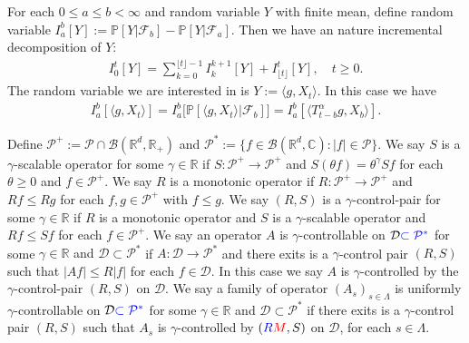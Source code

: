 \documentclass[12pt,oneside,english]{amsart}
\theoremstyle{plain}
\theoremstyle{definition}
\numberwithin{equation}{section}
\newcommand{\added}[1]{{\color{blue}#1}}\newcommand{\deleted}[1]{{\color{red}#1}}
\begin{document}
\added{
	For each $0 \leq a \leq b <\infty$ and  random variable $Y$ with finite mean, define random variable
$
   	I_a^b[Y]
    := \mathbb P[Y|\mathscr F_b] - \mathbb P[Y|\mathscr F_a].
$
	Then we have an nature incremental decomposition of $Y$:
\begin{align}
    I_0^t[Y]
    = \sum_{k = 0}^{\lfloor t \rfloor - 1} I_k^{k+1}[Y] + I_{\lfloor t \rfloor}^t[Y],
    \quad t\geq 0.
\end{align}
	The random variable we are interested in is $Y:= \langle g,X_t\rangle$. 
	In this case we have
\begin{align}
    I_a^b[\langle g,X_t\rangle] 
    = I_a^b\big[\mathbb P[\langle g,X_t\rangle|\mathscr F_b]\big]
    = I_a^b[ \langle T_{t-b}^\alpha g, X_b \rangle ].
\end{align}
}

    Define $\mathcal P^+:= \mathcal P \cap \mathcal B(\mathbb R^d, \mathbb R_+)$ and $\mathcal P^*:= \{f\in \mathscr B(\mathbb R^d, \mathbb C): |f|\in \mathcal P\}$.
    We say $S$ is a $\gamma$-scalable operator for some $\gamma\in \mathbb R$ if $S: \mathcal P^+ \to \mathcal P^+$ and $S(\theta f) = \theta^\gamma Sf$ for each $\theta \geq 0$ and $f \in \mathcal P^+$.
    We say $R$ is a monotonic operator if $R:\mathcal P^+ \to \mathcal P^+$ and $Rf \leq Rg$ for each $f, g \in \mathcal P^+$ with $f\leq g$.
    We say $(R,S)$ is a $\gamma$-control-pair for some $\gamma \in \mathbb R$ if $R$ is a monotonic operator and $S$ is a $\gamma$-scalable operator and $Rf\leq Sf$ for each $f\in \mathcal P^+$.
    We say an operator $A$ is $\gamma$-controllable on $\mathcal D \added{\subset \mathcal P^*}$ for some $\gamma \in \mathbb R$ \deleted{and $\mathcal D \subset \mathcal P^*$} if $A: \mathcal D \to \mathcal P^*$ and there \deleted{exits} \added{is} a $\gamma$-control pair $(R,S)$ such that $|Af|\leq R|f|$ for each $f\in \mathcal D$.
    In this case we say $A$ is $\gamma$-controlled by the $\gamma$-control-pair $(R,S)$ on $\mathcal D$.
    We say a family of operator $(A_s)_{s\in \Lambda}$ is uniformly $\gamma$-controllable on $\mathcal D\added{\subset \mathcal P^*}$ for some $\gamma \in \mathbb R$ \deleted{and $\mathcal D \subset \mathcal P^*$} if there \deleted{exits} \added{is} a $\gamma$-control pair $(R,S)$ such that $A_s$ is $\gamma$-controlled by $(\added{R}\deleted{M}, S)$ on $\mathcal D$, for each $s\in \Lambda$.
\end{document}
